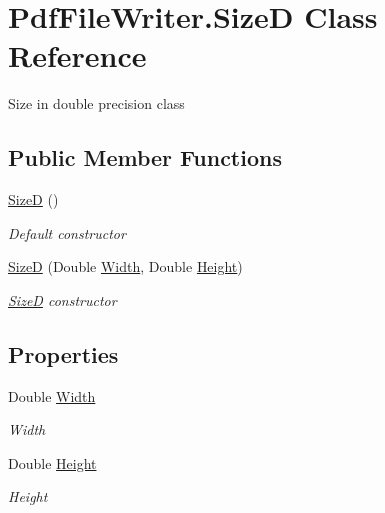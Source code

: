 \hypertarget{class_pdf_file_writer_1_1_size_d}{}\section{Pdf\+File\+Writer.\+SizeD Class Reference}
\label{class_pdf_file_writer_1_1_size_d}


Size in double precision class  


\subsection*{Public Member Functions}
\begin{DoxyCompactItemize}
\item 
\hyperlink{class_pdf_file_writer_1_1_size_d_a687bde87ca4eeaf130d97e88201d9d56}{SizeD} ()
\begin{DoxyCompactList}\small\item\em Default constructor \end{DoxyCompactList}\item 
\hyperlink{class_pdf_file_writer_1_1_size_d_abd7896a2b91e9a2eb9cd6a33e77dd221}{SizeD} (Double \hyperlink{class_pdf_file_writer_1_1_size_d_a9ce2c829ca30d0827805b5e401379611}{Width}, Double \hyperlink{class_pdf_file_writer_1_1_size_d_afdcea8b18b25f110fb8fbfc5524a784c}{Height})
\begin{DoxyCompactList}\small\item\em \hyperlink{class_pdf_file_writer_1_1_size_d}{SizeD} constructor \end{DoxyCompactList}\end{DoxyCompactItemize}
\subsection*{Properties}
\begin{DoxyCompactItemize}
\item 
Double \hyperlink{class_pdf_file_writer_1_1_size_d_a9ce2c829ca30d0827805b5e401379611}{Width}
\begin{DoxyCompactList}\small\item\em Width \end{DoxyCompactList}\item 
Double \hyperlink{class_pdf_file_writer_1_1_size_d_afdcea8b18b25f110fb8fbfc5524a784c}{Height}
\begin{DoxyCompactList}\small\item\em Height \end{DoxyCompactList}\end{DoxyCompactItemize}


